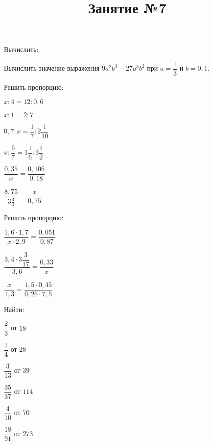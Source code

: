 \newpage
%	
\newpage
\title{Занятие №7}
\begin{listofex}
	\item Вычислить:
	\begin{enumcols}[itemcolumns=2]
		\item {}
		\item {}
	\end{enumcols}
	\item Вычислить значение выражения \( 9a^2b^3-27a^3b^2 \) при \( a=\dfrac{1}{3} \) и \( b=0,1 \).
	\item Решить пропорцию:
	\begin{enumcols}[itemcolumns=3]
		\item \( x:4=12:0,6 \)
		\item \( x:1=2:7 \)
		\item \( 0,7:x=\dfrac{1}{7}:2\dfrac{1}{10} \)
		\item \( x:\dfrac{6}{7}=1\dfrac{1}{6}:3\dfrac{1}{2} \)
		\item \( \dfrac{0,35}{x}=\dfrac{0,106}{0,18} \)
		\item \( \dfrac{8,75}{3\tfrac{3}{4}}=\dfrac{x}{0,75} \)
	\end{enumcols}
	\item Решить пропорцию:
	\begin{enumcols}[itemcolumns=3]
		\item \( \dfrac{1,6\cdot1,7}{x\cdot2,9}=\dfrac{0,051}{0,87} \)
		\item \( \dfrac{3,4\cdot3\dfrac{3}{17}}{3,6}=\dfrac{0,33}{x} \)
		\item \( \dfrac{x}{1,3}=\dfrac{1,5\cdot0,45}{0,26\cdot7,5} \)
	\end{enumcols}
	\item Найти:
	\begin{enumcols}[itemcolumns=3]
		\item \( \dfrac{2}{3} \) от \( 18 \)
		\item \( \dfrac{1}{4} \) от \( 28 \)
		\item \( \dfrac{3}{13} \) от \( 39 \)
		\item \( \dfrac{35}{37} \) от \( 114 \)
		\item \( \dfrac{4}{10} \) от \( 70 \)
		\item \( \dfrac{18}{91} \) от \( 273 \)
	\end{enumcols}
\end{listofex}
